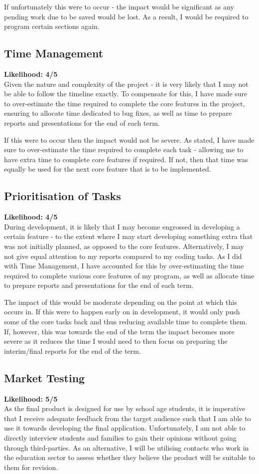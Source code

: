 \documentclass[]{final_report}
\begin{document}
If unfortunately this were to occur - the impact would be significant as any pending work due to be saved would be lost. As a result, I would be required to program certain sections again.

\subsection*{Time Management}
\textbf{Likelihood: 4/5}\\
Given the nature and complexity of the project - it is very likely that I may not be able to follow the timeline exactly. To compensate for this, I have made sure to over-estimate the time required to complete the core features in the project, ensuring to allocate time dedicated to bug fixes, as well as time to prepare reports and presentations for the end of each term.

If this were to occur then the impact would not be severe. As stated, I have made sure to over-estimate the time required to complete each task - allowing me to have extra time to complete core features if required. If not, then that time was equally be used for the next core feature that is to be implemented.

\subsection*{Prioritisation of Tasks}
\textbf{Likelihood: 4/5}\\
During development, it is likely that I may become engrossed in developing a certain feature - to the extent where I may start developing something extra that was not initially planned, as opposed to the core features. Alternatively, I may not give equal attention to my reports compared to my coding tasks. As I did with Time Management, I have accounted for this by over-estimating the time required to complete various core features of my program, as well as allocate time to prepare reports and presentations for the end of each term.

The impact of this would be moderate depending on the point at which this occurs in. If this were to happen early on in development, it would only push some of the core tasks back and thus reducing available time to complete them. If, however, this was towards the end of the term the impact becomes more severe as it reduces the time I would need to then focus on preparing the interim/final reports for the end of the term.

\subsection*{Market Testing}
\textbf{Likelihood: 5/5}\\
As the final product is designed for use by school age students, it is imperative that I receive adequate feedback from the target audience such that I am able to use it towards developing the final application. Unfortunately, I am not able to directly interview students and families to gain their opinions without going through third-parties. As an alternative, I will be utilising contacts who work in the education sector to assess whether they believe the product will be suitable to them for revision.
\end{document}
